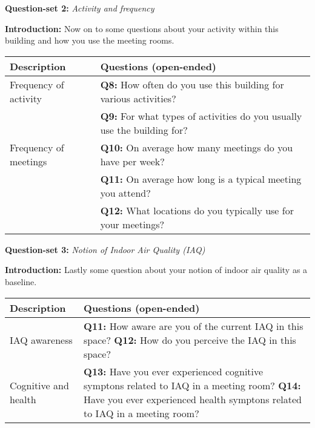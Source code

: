 \begin{appendices}
\vspace{-10pt}

\begin{table}[htbp]
    \captionsetup{justification=raggedright,singlelinecheck=false}
    \raggedright \textbf{Question-set 2:} \textit{Activity and frequency} \\
    \label{tab:column_widths}
    \raggedright \textbf{Introduction:} Now on to some questions about your activity within this building and how you use the meeting rooms.
    \begin{tabularx}{\textwidth}{|p{}|X|}
        \hline
        \textbf{Description} & \textbf{Questions (open-ended)} \\
        \hline
        Frequency of activity & \textbf{Q8:} How often do you use this building for various activities? \\
        & \textbf{Q9:} For what types of activities do you usually use the building for? \\
        \hline
        Frequency of meetings & \textbf{Q10:} On average how many meetings do you have per week? \\
        & \textbf{Q11:} On average how long is a typical meeting you attend? \\
        & \textbf{Q12:} What locations do you typically use for your meetings? \\
        \hline
    \end{tabularx}
\end{table}

\vspace{-10pt}

\begin{table}[htbp]
    \captionsetup{justification=raggedright,singlelinecheck=false}
    \raggedright \textbf{Question-set 3:} \textit{Notion of Indoor Air Quality (IAQ)} \\
    \label{tab:column_widths}
    \raggedright \textbf{Introduction:} Lastly some question about your notion of indoor air quality as a baseline.
    \begin{tabularx}{\textwidth}{|p{}|X|}
        \hline
        \textbf{Description} & \textbf{Questions (open-ended)} \\
        \hline
        IAQ awareness & \textbf{Q11:} How aware are you of the current IAQ in this space? 
        \newline
        \textbf{Q12:} How do you perceive the IAQ in this space? \\
        \hline
        Cognitive and health & \textbf{Q13:} Have you ever experienced cognitive symptons related to IAQ in a meeting room? 
        \newline
        \textbf{Q14:} Have you ever experienced health symptons related to IAQ in a meeting room?  \\
        \hline
    \end{tabularx}
\end{table}


\end{appendices}
